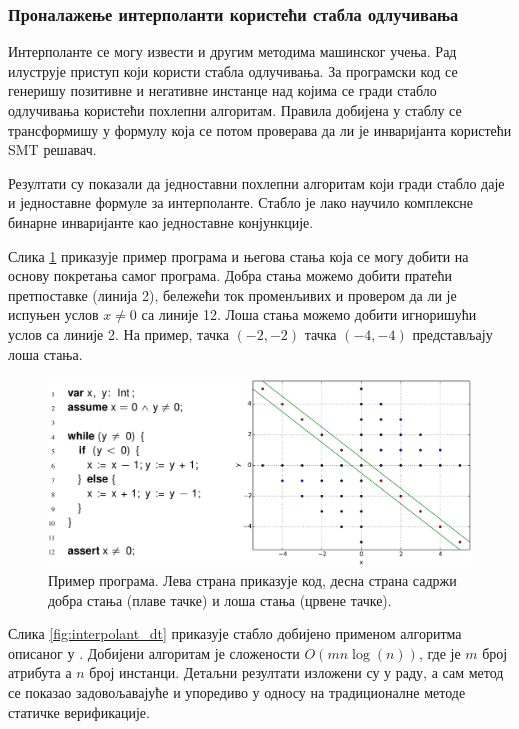 \documentclass[a4paper]{article}
\begin{document}
{\subsubsection{Проналажење интерполанти користећи стабла одлучивања}
\label{sssec:interpolant_dt}

Интерполанте се могу извести и другим методима машинског учења. Рад \cite{KrishnaPW15} илуструје приступ који
користи стабла одлучивања. За програмски код се генеришу позитивне и негативне инстанце над којима се гради
стабло одлучивања користећи похлепни алгоритам. Правила добијена у стаблу се трансформишу у формулу која
се потом проверава да ли је инваријанта користећи \textsc{SMT} решавач.

Резултати су показали да једноставни похлепни алгоритам који гради стабло даје и једноставне формуле
за интерполанте. Стабло је лако научило комплексне бинарне инваријанте као једноставне конјункције.

Слика \ref{fig:interpolant_example2} приказује пример програма и његова стања која се могу добити на основу
покретања самог програма. Добра стања можемо добити пратећи претпоставке (линија 2), бележећи ток променљивих
и провером да ли је испуњен услов $x \neq 0$ са линије 12. Лоша стања можемо добити игноришући услов са линије 2.
На пример, тачка $(-2, -2)$ тачка $(-4, -4)$ представљају лоша стања.

\begin{figure}[h!]
\begin{center}
\includegraphics[scale=0.18]{./slike/interpolant2.png}
\end{center}
    \caption{Пример програма. Лева страна приказује код, десна страна садржи добра стања (плаве тачке) и лоша
    стања (црвене тачке).}
\label{fig:interpolant_example2}
\end{figure}

Слика \ref{fig:interpolant_dt} приказује стабло добијено применом алгоритма описаног у \cite{KrishnaPW15}.
Добијени алгоритам је сложености $O(mn \log(n))$, где је $m$ број атрибута а $n$ број инстанци.
Детаљни резултати изложени су у раду, а сам метод се показао задовољавајуће и упоредиво у односу
на традиционалне методе статичке верификације.

}
\end{document}

